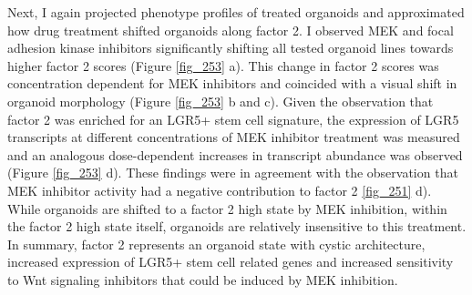 \begin{flushleft}
Next, I again projected phenotype profiles of treated organoids and approximated how drug treatment shifted organoids along factor 2. I observed MEK and focal adhesion kinase inhibitors significantly shifting all tested organoid lines towards higher factor 2 scores (Figure \ref{fig_253} a). This change in factor 2 scores was concentration dependent for MEK inhibitors and coincided with a visual shift in organoid morphology (Figure \ref{fig_253} b and c). Given the observation that factor 2 was enriched for an LGR5+ stem cell signature, the expression of LGR5 transcripts at different concentrations of MEK inhibitor treatment was measured and an analogous dose-dependent increases in transcript abundance was observed (Figure \ref{fig_253} d). These findings were in agreement with the observation that MEK inhibitor activity had a negative contribution to factor 2 \ref{fig_251} d). While organoids are shifted to a factor 2 high state by MEK inhibition, within the factor 2 high state itself, organoids are relatively insensitive to this treatment. In summary, factor 2 represents an organoid state with cystic architecture, increased expression of LGR5+ stem cell related genes and increased sensitivity to Wnt signaling inhibitors that could be induced by MEK inhibition.

\end{flushleft}

